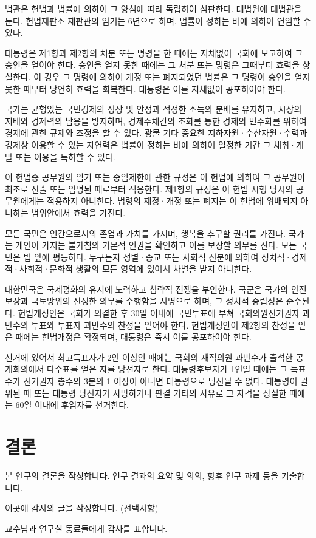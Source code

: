 \documentclass[master, korean]{pnuthesis}
\begin{document}
법관은 헌법과 법률에 의하여 그 양심에 따라 독립하여 심판한다. 대법원에 대법관을 둔다. 헌법재판소 재판관의 임기는 6년으로 하며, 법률이 정하는 바에 의하여 연임할 수 있다.

대통령은 제1항과 제2항의 처분 또는 명령을 한 때에는 지체없이 국회에 보고하여 그 승인을 얻어야 한다. 승인을 얻지 못한 때에는 그 처분 또는 명령은 그때부터 효력을 상실한다. 이 경우 그 명령에 의하여 개정 또는 폐지되었던 법률은 그 명령이 승인을 얻지 못한 때부터 당연히 효력을 회복한다. 대통령은 이를 지체없이 공포하여야 한다.

국가는 균형있는 국민경제의 성장 및 안정과 적정한 소득의 분배를 유지하고, 시장의 지배와 경제력의 남용을 방지하며, 경제주체간의 조화를 통한 경제의 민주화를 위하여 경제에 관한 규제와 조정을 할 수 있다. 광물 기타 중요한 지하자원·수산자원·수력과 경제상 이용할 수 있는 자연력은 법률이 정하는 바에 의하여 일정한 기간 그 채취·개발 또는 이용을 특허할 수 있다.

이 헌법중 공무원의 임기 또는 중임제한에 관한 규정은 이 헌법에 의하여 그 공무원이 최초로 선출 또는 임명된 때로부터 적용한다. 제1항의 규정은 이 헌법 시행 당시의 공무원에게는 적용하지 아니한다. 법령의 제정·개정 또는 폐지는 이 헌법에 위배되지 아니하는 범위안에서 효력을 가진다.

모든 국민은 인간으로서의 존엄과 가치를 가지며, 행복을 추구할 권리를 가진다. 국가는 개인이 가지는 불가침의 기본적 인권을 확인하고 이를 보장할 의무를 진다. 모든 국민은 법 앞에 평등하다. 누구든지 성별·종교 또는 사회적 신분에 의하여 정치적·경제적·사회적·문화적 생활의 모든 영역에 있어서 차별을 받지 아니한다.

대한민국은 국제평화의 유지에 노력하고 침략적 전쟁을 부인한다. 국군은 국가의 안전보장과 국토방위의 신성한 의무를 수행함을 사명으로 하며, 그 정치적 중립성은 준수된다. 헌법개정안은 국회가 의결한 후 30일 이내에 국민투표에 부쳐 국회의원선거권자 과반수의 투표와 투표자 과반수의 찬성을 얻어야 한다. 헌법개정안이 제2항의 찬성을 얻은 때에는 헌법개정은 확정되며, 대통령은 즉시 이를 공포하여야 한다.

선거에 있어서 최고득표자가 2인 이상인 때에는 국회의 재적의원 과반수가 출석한 공개회의에서 다수표를 얻은 자를 당선자로 한다. 대통령후보자가 1인일 때에는 그 득표수가 선거권자 총수의 3분의 1 이상이 아니면 대통령으로 당선될 수 없다. 대통령이 궐위된 때 또는 대통령 당선자가 사망하거나 판결 기타의 사유로 그 자격을 상실한 때에는 60일 이내에 후임자를 선거한다.

\chapter{결론}
본 연구의 결론을 작성합니다. 연구 결과의 요약 및 의의, 향후 연구 과제 등을 기술합니다.




\pagebreak
\acknowledgement
이곳에 감사의 글을 작성합니다. (선택사항)

교수님과 연구실 동료들에게 감사를 표합니다.
\end{document}
